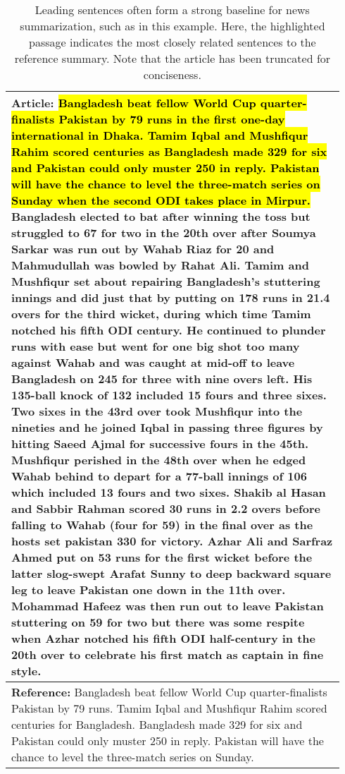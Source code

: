\begin{table}[t]
    \centering
    \small
    \begin{tabular}{|p{0.94\linewidth}|}
        \hline
        \textbf{Article:} \hl{Bangladesh beat fellow World Cup quarter-finalists Pakistan by 79 runs in the first one-day international in Dhaka. Tamim Iqbal and Mushfiqur Rahim scored centuries as Bangladesh made 329 for six and Pakistan could only muster 250 in reply. Pakistan will have the chance to level the three-match series on Sunday when the second ODI takes place in Mirpur.} Bangladesh elected to bat after winning the toss but struggled to 67 for two in the 20th over after Soumya Sarkar was run out by Wahab Riaz for 20 and Mahmudullah was bowled by Rahat Ali. Tamim and Mushfiqur set about repairing Bangladesh's stuttering innings and did just that by putting on 178 runs in 21.4 overs for the third wicket, during which time Tamim notched his fifth ODI century. He continued to plunder runs with ease but went for one big shot too many against Wahab and was caught at mid-off to leave Bangladesh on 245 for three with nine overs left. His 135-ball knock of 132 included 15 fours and three sixes. Two sixes in the 43rd over took Mushfiqur into the nineties and he joined Iqbal in passing three figures by hitting Saeed Ajmal for successive fours in the 45th. Mushfiqur perished in the 48th over when he edged Wahab behind to depart for a 77-ball innings of 106 which included 13 fours and two sixes. Shakib al Hasan and Sabbir Rahman scored 30 runs in 2.2 overs before falling to Wahab (four for 59) in the final over as the hosts set pakistan 330 for victory. Azhar Ali and Sarfraz Ahmed put on 53 runs for the first wicket before the latter slog-swept Arafat Sunny to deep backward square leg to leave Pakistan one down in the 11th over. Mohammad Hafeez was then run out to leave Pakistan stuttering on 59 for two but there was some respite when Azhar notched his fifth ODI half-century in the 20th over to celebrate his first match as captain in fine style.\\ \hline
        \textbf{Reference:} Bangladesh beat fellow World Cup quarter-finalists Pakistan by 79 runs. Tamim Iqbal and Mushfiqur Rahim scored centuries for Bangladesh. Bangladesh made 329 for six and Pakistan could only muster 250 in reply. Pakistan will have the chance to level the three-match series on Sunday. \\
        \hline
    \end{tabular}
    \caption[An example in which leading sentences form a good summary.]{Leading sentences often form a strong baseline for news summarization, such as in this example. Here, the highlighted passage indicates the most closely related sentences to the reference summary. Note that the article has been truncated for conciseness.}
    \label{tab:lead_ex}
\end{table}


